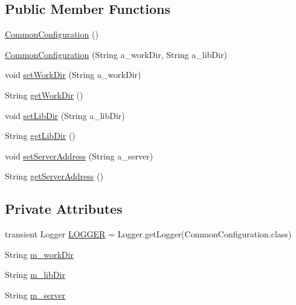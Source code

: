 \subsection*{Public Member Functions}
\begin{DoxyCompactItemize}
\item 
\hyperlink{classorg_1_1jgap_1_1distr_1_1grid_1_1common_1_1_common_configuration_a2bcf4554a5ab6dcf01b93df93bdf47c7}{Common\-Configuration} ()
\item 
\hyperlink{classorg_1_1jgap_1_1distr_1_1grid_1_1common_1_1_common_configuration_a8d2207f9895480f96a7d9d67fee0b627}{Common\-Configuration} (String a\-\_\-work\-Dir, String a\-\_\-lib\-Dir)
\item 
void \hyperlink{classorg_1_1jgap_1_1distr_1_1grid_1_1common_1_1_common_configuration_ac16d5332d94bb0426a00ff7ec8be95e1}{set\-Work\-Dir} (String a\-\_\-work\-Dir)
\item 
String \hyperlink{classorg_1_1jgap_1_1distr_1_1grid_1_1common_1_1_common_configuration_a819a122875ce823cae56951c92d40409}{get\-Work\-Dir} ()
\item 
void \hyperlink{classorg_1_1jgap_1_1distr_1_1grid_1_1common_1_1_common_configuration_ad15ce71aec854c8865ff1d2b1352542b}{set\-Lib\-Dir} (String a\-\_\-lib\-Dir)
\item 
String \hyperlink{classorg_1_1jgap_1_1distr_1_1grid_1_1common_1_1_common_configuration_a4b6b43cf9cdad01bedeb18e382f2edb8}{get\-Lib\-Dir} ()
\item 
void \hyperlink{classorg_1_1jgap_1_1distr_1_1grid_1_1common_1_1_common_configuration_a9306c8a0c3df39c3d44b2cf72718de60}{set\-Server\-Address} (String a\-\_\-server)
\item 
String \hyperlink{classorg_1_1jgap_1_1distr_1_1grid_1_1common_1_1_common_configuration_ac5b0e5b3d92a53e25fa167739cc1ee3c}{get\-Server\-Address} ()
\end{DoxyCompactItemize}
\subsection*{Private Attributes}
\begin{DoxyCompactItemize}
\item 
transient Logger \hyperlink{classorg_1_1jgap_1_1distr_1_1grid_1_1common_1_1_common_configuration_a353a5f269cd3972691a1032825442712}{L\-O\-G\-G\-E\-R} = Logger.\-get\-Logger(Common\-Configuration.\-class)
\item 
String \hyperlink{classorg_1_1jgap_1_1distr_1_1grid_1_1common_1_1_common_configuration_aae3a21d46d0bcb5c908d5d8ac1a2a768}{m\-\_\-work\-Dir}
\item 
String \hyperlink{classorg_1_1jgap_1_1distr_1_1grid_1_1common_1_1_common_configuration_aafbacb19c3cd160c3051bda6674da6c1}{m\-\_\-lib\-Dir}
\item 
String \hyperlink{classorg_1_1jgap_1_1distr_1_1grid_1_1common_1_1_common_configuration_af620834aa79c9007cbdc8c6e6680a467}{m\-\_\-server}
\end{DoxyCompactItemize}
